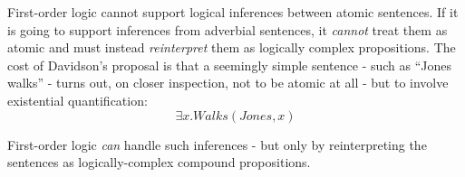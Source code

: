 First-order logic cannot support logical inferences between atomic
sentences.  If it is going to support inferences from adverbial
sentences, it \emph{cannot} treat them as atomic and must instead
\emph{reinterpret} them as logically complex propositions.  The cost
of Davidson's proposal is that a seemingly simple sentence - such as
``Jones walks'' - turns out, on closer inspection, not to be atomic at
all - but to involve existential quantification:
\[
\exists x.  \mathit{Walks}(\mathit{Jones}, x)
\]

\NI First-order logic \emph{can} handle such inferences - but only by
reinterpreting the sentences as logically-complex compound
propositions.
